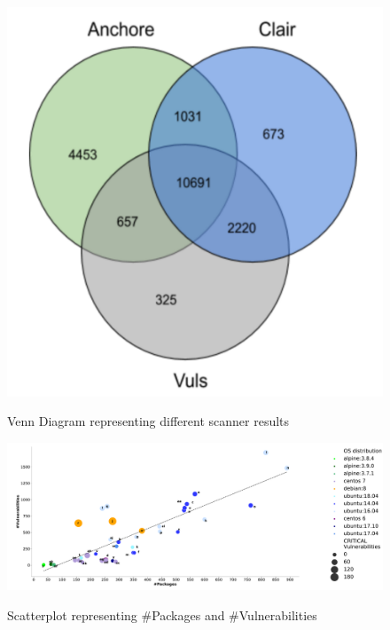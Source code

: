 \documentclass[a4paper,num-refs]{oup-contemporary}
\begin{document}
\begin{figure}
        {\includegraphics[scale=2.5,width=\columnwidth]
        {Figures/vennDiagram.pdf}}
        \caption{\label{fig:venn} Venn Diagram representing different scanner results}
\end{figure}

\begin{figure}[t]
	{\includegraphics[scale=1.5,width=\textwidth]
	{Figures/vulngraph.pdf}}
        \caption{\label{fig:graph1} Scatterplot representing \#Packages and \#Vulnerabilities}
      \end{figure}
\end{document}
